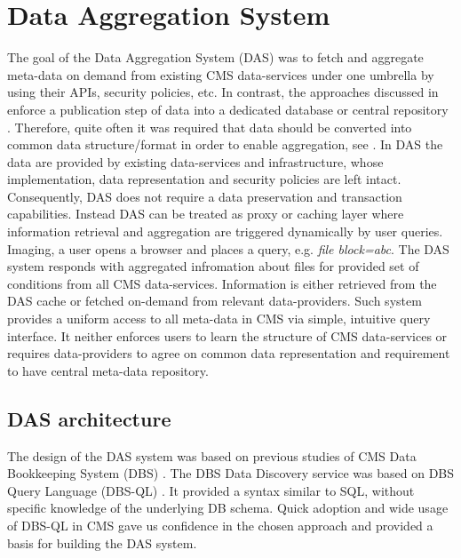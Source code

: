 \documentclass[1p,times]{elsarticle}
\begin{document}
\section{Data Aggregation System\label{DAS}}
The goal of the Data Aggregation System (DAS) was to fetch and aggregate meta-data 
on demand from existing CMS data-services under one umbrella by using their APIs, 
security policies, etc. In contrast, the approaches
discussed in \cite{DBXplorer, QueryAnswer, FedDB}
enforce a publication step of data into a dedicated database 
or central repository \cite{iRODS}. Therefore, quite often it was required
that data should be converted into common data structure/format in order to enable
aggregation, see \cite{OpenArchive}. In DAS the data are provided
by existing data-services and infrastructure, whose implementation,
data representation and security policies are left intact. Consequently,
DAS does not require a data preservation and transaction capabilities. 
Instead DAS can be treated as proxy or caching layer where information 
retrieval and aggregation are triggered dynamically by user queries. 
Imaging, a user opens a browser and places a query, e.g.
{\it file block=abc}. The DAS system responds with aggregated infromation about files
for provided set of conditions from all CMS data-services. Information
is either retrieved from the DAS cache or fetched on-demand from relevant
data-providers. Such system provides a uniform access to all meta-data in CMS 
via simple, intuitive query interface. It neither enforces users to learn 
the structure of CMS data-services
or requires data-providers to agree on common data representation
and requirement to have central meta-data repository.


\subsection{DAS architecture}
The design of the DAS system was based on previous studies of CMS Data 
Bookkeeping System (DBS) \cite{DBS, DBS07}. The DBS Data Discovery service
\cite{DD} was based on DBS Query Language (DBS-QL) \cite{DBS-QL}. It provided
a syntax similar to SQL, without specific knowledge of the underlying DB schema.
Quick adoption and wide usage of DBS-QL in CMS gave us confidence in the chosen approach 
and provided a basis for building the DAS system.
\end{document}
